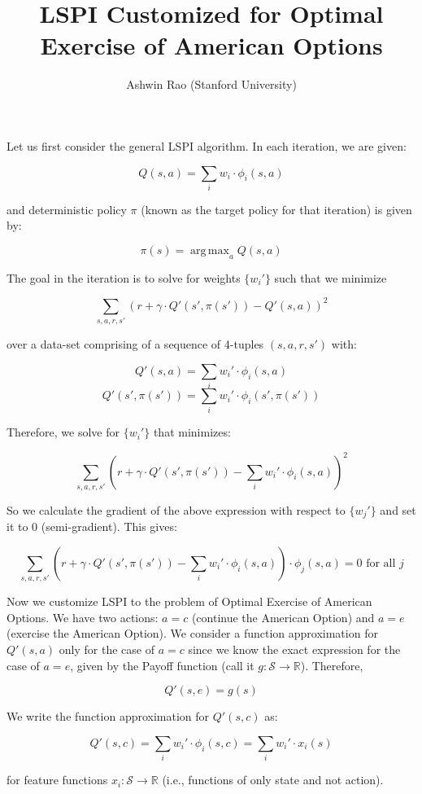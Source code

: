 \documentclass[12pt]{amsart}
\title{LSPI Customized for Optimal Exercise of American Options}
\author{Ashwin Rao (Stanford University)}
\date{} %
\DeclareMathOperator*{\argmax}{arg\,max}
\begin{document}
\maketitle

Let us first consider the general LSPI algorithm. In each iteration, we are given:

$$Q(s,a) = \sum_i w_i \cdot \phi_i(s,a)$$

and deterministic policy $\pi$ (known as the target policy for that iteration) is given by:

$$\pi(s) = \argmax_a Q(s,a)$$

The goal in the iteration is to solve for weights $\{w_i'\}$ such that we minimize

$$\sum_{s,a,r,s'} (r + \gamma \cdot Q'(s',\pi(s')) - Q'(s,a))^2$$

over a data-set comprising of a sequence of 4-tuples $(s,a,r,s')$ with:

$$Q'(s,a) = \sum_i w_i' \cdot \phi_i(s,a)$$
$$Q'(s',\pi(s')) = \sum_i w_i' \cdot \phi_i(s', \pi(s'))$$

Therefore, we solve for $\{w_i'\}$ that minimizes:

$$\sum_{s,a,r,s'} (r + \gamma \cdot Q'(s',\pi(s')) - \sum_i w_i' \cdot \phi_i(s,a))^2$$

So we calculate the gradient of the above expression with respect to $\{w_j'\}$ and set it to 0 (semi-gradient). This gives:

\begin{equation}
\sum_{s,a,r,s'} (r + \gamma \cdot Q'(s',\pi(s')) - \sum_i w_i' \cdot \phi_i(s,a)) \cdot \phi_j(s,a) = 0 \text{ for all } j
\label{eq:general-lspi}
\end{equation}

Now we customize LSPI to the problem of Optimal Exercise of American Options. We have two actions: $a=c$ (continue the American Option) and $a=e$ (exercise the American Option). We consider a function approximation for $Q'(s,a)$ only for the case of $a=c$ since we know the exact expression for the case of $a=e$, given by the Payoff function (call it $g: \mathcal{S} \rightarrow \mathbb{R}$). Therefore,

$$Q'(s,e) = g(s)$$

We write the function approximation for $Q'(s,c)$ as:

$$Q'(s,c) = \sum_i w_i' \cdot \phi_i(s, c) = \sum_i w_i' \cdot x_i(s)$$

for feature functions $x_i: \mathcal{S} \rightarrow \mathbb{R}$ (i.e., functions of only state and not action).
\end{document}
